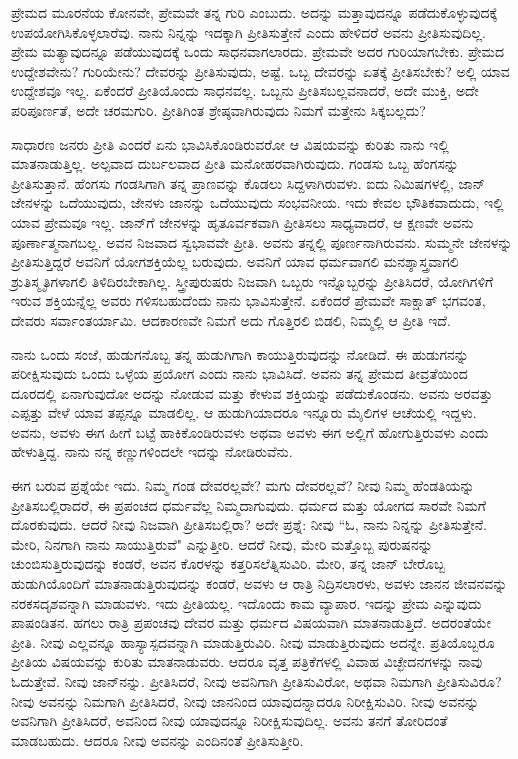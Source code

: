 ಪ್ರೇಮದ ಮೂರನೆಯ ಕೋನವೇ, ಪ್ರೇಮವೇ ತನ್ನ ಗುರಿ ಎಂಬುದು. ಅದನ್ನು ಮತ್ತಾವುದನ್ನೂ ಪಡೆದುಕೊಳ್ಳುವುದಕ್ಕೆ ಉಪಯೋಗಿಸಿಕೊಳ್ಳಲಾರೆವು. ನಾನು ನಿನ್ನನ್ನು ಇದಕ್ಕಾಗಿ ಪ್ರೀತಿಸುತ್ತೇನೆ ಎಂದು ಹೇಳಿದರೆ ಅವನು ಪ್ರೀತಿಸುವುದಿಲ್ಲ. ಪ್ರೇಮ ಮತ್ಯಾವುದನ್ನೂ ಪಡೆಯುವುದಕ್ಕೆ ಒಂದು ಸಾಧನವಾಗಲಾರದು. ಪ್ರೇಮವೇ ಅದರ ಗುರಿಯಾಗಬೇಕು. ಪ್ರೇಮದ ಉದ್ದೇಶವೇನು? ಗುರಿಯೇನು? ದೇವರನ್ನು ಪ್ರೀತಿಸುವುದು, ಅಷ್ಟೆ. ಒಬ್ಬ ದೇವರನ್ನು ಏತಕ್ಕೆ ಪ್ರೀತಿಸಬೇಕು? ಅಲ್ಲಿ ಯಾವ ಉದ್ದೇಶವೂ ಇಲ್ಲ. ಏಕೆಂದರೆ ಪ್ರೀತಿಯೊಂದು ಸಾಧನವಲ್ಲ. ಒಬ್ಬನು ಪ್ರೀತಿಸಬಲ್ಲವನಾದರೆ, ಅದೇ ಮುಕ್ತಿ, ಅದೇ ಪರಿಪೂರ್ಣತೆ, ಅದೇ ಚರಮಗುರಿ. ಪ್ರೀತಿಗಿಂತ ಶ್ರೇಷ್ಠವಾಗಿರುವುದು ನಿಮಗೆ ಮತ್ತೇನು ಸಿಕ್ಕಬಲ್ಲದು?

ಸಾಧಾರಣ ಜನರು ಪ್ರೀತಿ ಎಂದರೆ ಏನು ಭಾವಿಸಿಕೊಂಡಿರುವರೋ ಆ ವಿಷಯವನ್ನು ಕುರಿತು ನಾನು ಇಲ್ಲಿ ಮಾತನಾಡುತ್ತಿಲ್ಲ. ಅಲ್ಪವಾದ ದುರ್ಬಲವಾದ ಪ್ರೀತಿ ಮನೋಹರವಾಗಿರುವುದು. ಗಂಡಸು ಒಬ್ಬ ಹೆಂಗಸನ್ನು ಪ್ರೀತಿಸುತ್ತಾನೆ. ಹೆಂಗಸು ಗಂಡಸಿಗಾಗಿ ತನ್ನ ಪ್ರಾಣವನ್ನು ಕೊಡಲು ಸಿದ್ದಳಾಗಿರುವಳು. ಐದು ನಿಮಿಷಗಳಲ್ಲಿ, ಜಾನ್ ಜೇನಳನ್ನು ಒದೆಯುವುದು, ಜೇನಳು ಜಾನನ್ನು ಒದೆಯುವುದು ಸಂಭವನೀಯ. ಇದು ಕೇವಲ ಭೌತಿಕವಾದುದು, ಇಲ್ಲಿ ಯಾವ ಪ್ರೇಮವೂ ಇಲ್ಲ. ಜಾನ್‌ಗೆ ಜೇನಳನ್ನು ಹೃತೂರ್ವಕವಾಗಿ ಪ್ರೀತಿಸಲು ಸಾಧ್ಯವಾದರೆ, ಆ ಕ್ಷಣವೇ ಅವನು ಪೂರ್ಣಾತ್ಮನಾಗಬಲ್ಲ. ಅವನ ನಿಜವಾದ ಸ್ವಭಾವವೇ ಪ್ರೀತಿ. ಅವನು ತನ್ನಲ್ಲಿ ಪೂರ್ಣನಾಗಿರುವನು. ಸುಮ್ಮನೇ ಜೇನಳನ್ನು ಪ್ರೀತಿಸುತ್ತಿದ್ದರೆ ಅವನಿಗೆ ಯೋಗಶಕ್ತಿಯೆಲ್ಲ ಬರುವುದು. ಅವನಿಗೆ ಯಾವ ಧರ್ಮವಾಗಲಿ ಮನಶ್ಶಾಸ್ತ್ರವಾಗಲಿ ಶ್ರುತಿಸ್ಮೃತಿಗಳಾಗಲಿ ತಿಳಿದಿರಬೇಕಾಗಿಲ್ಲ. ಸ್ತ್ರೀಪುರುಷರು ನಿಜವಾಗಿ ಒಬ್ಬರು ಇನ್ನೊಬ್ಬರನ್ನು ಪ್ರೀತಿಸಿದರೆ, ಯೋಗಿಗಳಿಗೆ ಇರುವ ಶಕ್ತಿಯನ್ನೆಲ್ಲ ಅವರು ಗಳಿಸಬಹುದೆಂದು ನಾನು ಭಾವಿಸುತ್ತೇನೆ. ಏಕೆಂದರೆ ಪ್ರೇಮವೇ ಸಾಕ್ಷಾತ್ ಭಗವಂತ, ದೇವರು ಸರ್ವಾಂತರ್ಯಾಮಿ. ಆದಕಾರಣವೇ ನಿಮಗೆ ಅದು ಗೊತ್ತಿರಲಿ ಬಿಡಲಿ, ನಿಮ್ಮಲ್ಲಿ ಆ ಪ್ರೀತಿ ಇದೆ.

ನಾನು ಒಂದು ಸಂಜೆ, ಹುಡುಗನೊಬ್ಬ ತನ್ನ ಹುಡುಗಿಗಾಗಿ ಕಾಯುತ್ತಿರುವುದನ್ನು ನೋಡಿದೆ. ಈ ಹುಡುಗನನ್ನು ಪರೀಕ್ಷಿಸುವುದು ಒಂದು ಒಳ್ಳೆಯ ಪ್ರಯೋಗ ಎಂದು ನಾನು ಭಾವಿಸಿದೆ. ಅವನು ತನ್ನ ಪ್ರೇಮದ ತೀವ್ರತೆಯಿಂದ ದೂರದಲ್ಲಿ ಏನಾಗುವುದೋ ಅದನ್ನು ನೋಡುವ ಮತ್ತು ಕೇಳುವ ಶಕ್ತಿಯನ್ನು ಪಡೆದುಕೊಂಡನು. ಅವನು ಅರವತ್ತು ಎಪ್ಪತ್ತು ವೇಳೆ ಯಾವ ತಪ್ಪನ್ನೂ ಮಾಡಲಿಲ್ಲ. ಆ ಹುಡುಗಿಯಾದರೂ ಇನ್ನೂರು ಮೈಲಿಗಳ ಆಚೆಯಲ್ಲಿ ಇದ್ದಳು. ಅವನು, ಅವಳು ಈಗ ಹೀಗೆ ಬಟ್ಟೆ ಹಾಕಿಕೊಂಡಿರುವಳು ಅಥವಾ ಅವಳು ಈಗ ಅಲ್ಲಿಗೆ ಹೋಗುತ್ತಿರುವಳು ಎಂದು ಹೇಳುತ್ತಿದ್ದ. ನಾನು ನನ್ನ ಕಣ್ಣುಗಳಿಂದಲೇ ಇದನ್ನು ನೋಡಿರುವೆನು.

ಈಗ ಬರುವ ಪ್ರಶ್ನೆಯೇ ಇದು. ನಿಮ್ಮ ಗಂಡ ದೇವರಲ್ಲವೇ? ಮಗು ದೇವರಲ್ಲವೆ? ನೀವು ನಿಮ್ಮ ಹೆಂಡತಿಯನ್ನು ಪ್ರೀತಿಸಬಲ್ಲಿರಾದರೆ, ಈ ಪ್ರಪಂಚದ ಧರ್ಮವೆಲ್ಲ ನಿಮ್ಮದಾಗುವುದು. ಧರ್ಮದ ಮತ್ತು ಯೋಗದ ಸಾರವೇ ನಿಮಗೆ ದೊರಕುವುದು. ಆದರೆ ನೀವು ನಿಜವಾಗಿ ಪ್ರೀತಿಸಬಲ್ಲಿರಾ? ಅದೇ ಪ್ರಶ್ನೆ: ನೀವು “ಓ, ನಾನು ನಿನ್ನನ್ನು ಪ್ರೀತಿಸುತ್ತೇನೆ. ಮೇರಿ, ನಿನಗಾಗಿ ನಾನು ಸಾಯುತ್ತಿರುವೆ" ಎನ್ನುತ್ತೀರಿ. ಆದರೆ ನೀವು, ಮೇರಿ ಮತ್ತೊಬ್ಬ ಪುರುಷನನ್ನು ಚುಂಬಿಸುತ್ತಿರುವುದನ್ನು ಕಂಡರೆ, ಅವನ ಕೊರಳನ್ನು ಕತ್ತರಿಸಲೆತ್ನಿಸುವಿರಿ. ಮೇರಿ, ತನ್ನ ಜಾನ್ ಬೇರೊಬ್ಬ ಹುಡುಗಿಯೊಂದಿಗೆ ಮಾತನಾಡುತ್ತಿರುವುದನ್ನು ಕಂಡರೆ, ಅವಳು ಆ ರಾತ್ರಿ ನಿದ್ರಿಸಲಾರಳು, ಅವಳು ಜಾನನ ಜೀವನವನ್ನು ನರಕಸದೃಶವನ್ನಾಗಿ ಮಾಡುವಳು. ಇದು ಪ್ರೀತಿಯಲ್ಲ. ಇದೊಂದು ಕಾಮ ವ್ಯಾಪಾರ. ಇದನ್ನು ಪ್ರೇಮ ಎನ್ನುವುದು ಪಾಷಂಡಿತನ. ಹಗಲು ರಾತ್ರಿ ಪ್ರಪಂಚವು ದೇವರ ಮತ್ತು ಧರ್ಮದ ವಿಷಯವಾಗಿ ಮಾತನಾಡುತ್ತಿದೆ. ಅದರಂತೆಯೇ ಪ್ರೀತಿ. ನೀವು ಎಲ್ಲವನ್ನೂ ಹಾಸ್ಯಾಸ್ಪದವನ್ನಾಗಿ ಮಾಡುತ್ತಿರುವಿರಿ. ನೀವು ಮಾಡುತ್ತಿರುವುದು ಅದನ್ನೇ. ಪ್ರತಿಯೊಬ್ಬರೂ ಪ್ರೀತಿಯ ವಿಷಯವನ್ನು ಕುರಿತು ಮಾತನಾಡುವರು. ಆದರೂ ವೃತ್ತ ಪತ್ರಿಕೆಗಳಲ್ಲಿ ವಿವಾಹ ವಿಚ್ಛೇದನಗಳನ್ನು ನಾವು ಓದುತ್ತೇವೆ. ನೀವು ಜಾನ್‌ನನ್ನು. ಪ್ರೀತಿಸಿದರೆ, ನೀವು ಅವನಿಗಾಗಿ ಪ್ರೀತಿಸುವಿರೋ, ಅಥವಾ ನಿಮಗಾಗಿ ಪ್ರೀತಿಸುವಿರೂ? ನೀವು ಅವನನ್ನು ನಿಮಗಾಗಿ ಪ್ರೀತಿಸಿದರೆ, ನೀವು ಜಾನನಿಂದ ಯಾವುದನ್ನಾದರೂ ನಿರೀಕ್ಷಿಸುವಿರಿ. ನೀವು ಅವನನ್ನು ಅವನಿಗಾಗಿ ಪ್ರೀತಿಸಿದರೆ, ಅವನಿಂದ ನೀವು ಯಾವುದನ್ನೂ ನಿರೀಕ್ಷಿಸುವುದಿಲ್ಲ. ಅವನು ತನಗೆ ತೋರಿದಂತೆ ಮಾಡಬಹುದು. ಆದರೂ ನೀವು ಅವನನ್ನು ಎಂದಿನಂತೆ ಪ್ರೀತಿಸುತ್ತೀರಿ.

